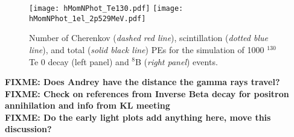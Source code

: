 \begin{figure*}[ht]
  \centering
  \texttt{[image: hMomNPhot\_Te130.pdf]}
  \texttt{[image: hMomNPhot\_1el\_2p529MeV.pdf]}
  \caption{Number of Cherenkov (\emph{dashed red line}), scintillation
    (\emph{dotted blue line}), and total (\emph{solid black line}) PEs
    for the simulation of 1000 $^{130}$Te 0{\nbb} decay (left panel)
    and $^8$B (\emph{right panel}) events.}
\label{fig:NPhotDist}
\end{figure*}

\textbf{FIXME: Does Andrey have the distance the gamma rays travel?} \\
\textbf{FIXME: Check on references from Inverse Beta decay for positron annihilation and info from KL meeting}\\
\textbf{FIXME: Do the early light plots add anything here, move this discussion?}\\

